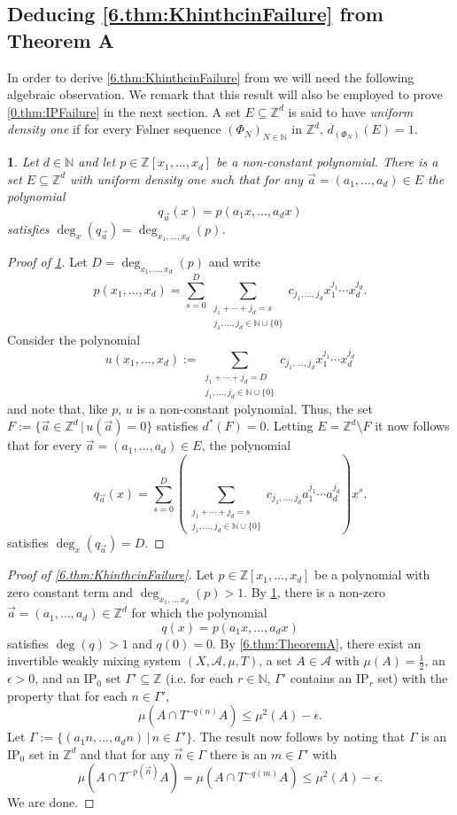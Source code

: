 \documentclass[11pt,american,preprint]{elsarticle}
\numberwithin{equation}{section}
\theoremstyle{plain}
\theoremstyle{plain*}
\theoremstyle{plain}
\newtheorem{lem}[thm]{\protect\lemmaname}
\theoremstyle{plain*}
\theoremstyle{plain}
\theoremstyle{plain*}
\theoremstyle{remark}
\theoremstyle{remark*}
\theoremstyle{remark}
\theoremstyle{remark*}
\theoremstyle{remark}
\theoremstyle{remark*}
\theoremstyle{plain}
\theoremstyle{definition}
\theoremstyle{plain}
\theoremstyle{plain} %
\providecommand{\lemmaname}{Lemma}
\newcommand{\N}{\mathbb{N}}
\newcommand{\Z}{\mathbb{Z}}
\begin{document}
\subsection{Deducing \cref{6.thm:KhinthcinFailure} from Theorem A}\label{sec:7.1}
In order to  derive \cref{6.thm:KhinthcinFailure}   from  \cite[Theorem A]{ZelIP0Khintchine2023} we will need the following algebraic observation. We remark that this result will also be employed to prove \cref{0.thm:IPFailure} in the next section. A set $E\subseteq \Z^d$ is said to have \textit{uniform density one} if  for every F{\o}lner sequence $(\Phi_N)_{N\in\N}$ in $\Z^d$, $\overline d_{(\Phi_N)}(E)=1$.  
\begin{lem}\label{6.lem:DegreeOfLinearRestriction}
    Let $d\in\N$ and let $p\in \Z[x_1,...,x_d]$ be a non-constant polynomial. There is a set $E\subseteq \Z^d$ with uniform density one such that for any $\vec a=(a_1,...,a_d)\in E$ the polynomial 
    $$q_{\vec a}(x)=p(a_1x,...,a_dx)$$
    satisfies $\deg_x(q_{\vec a})=\deg_{x_1,...,x_d}(p)$.
\end{lem}
\begin{proof}[Proof of \cref{6.lem:DegreeOfLinearRestriction}] Let $D=\deg_{x_1,...,x_d}(p)$ and   write
$$
p(x_1,...,x_d)=\sum_{s=0}^D\sum_{\substack{j_1+\cdots+j_d=s\\j_1,...,j_d\in\N\cup\{0\}}}c_{j_1,...,j_d}x_1^{j_1}\cdots x_d^{j_d}.
$$
Consider the polynomial 
$$
u(x_1,...,x_d):= \sum_{\substack{j_1+\cdots+j_d=D\\j_1,...,j_d\in\N\cup\{0\}}}c_{j_1,...,j_d}x_1^{j_1}\cdots x_d^{j_d}
$$
and note that, like $p$, $u$ is a non-constant polynomial. Thus,  the set $F:=\{\vec a\in\Z^d\,|\,u(\vec a)=0 \}$ satisfies $d^*(F)=0$. Letting $E=\Z^d\setminus F$ it now follows that for every $\vec a=(a_1,...,a_d)\in E$, the polynomial  
$$
q_{\vec a}(x)=\sum_{s=0}^D\left(\sum_{\substack{j_1+\cdots+j_d=s\\j_1,...,j_d\in\N\cup\{0\}}}c_{j_1,...,j_d}a_1^{j_1}\cdots a_d^{j_d}\right)x^s.
$$
satisfies $\deg_x(q_{\vec a})=D$.
\end{proof}
\begin{proof}[Proof of \cref{6.thm:KhinthcinFailure}]
Let $p\in \Z[x_1,...,x_d]$ be a polynomial with zero constant term and  $\deg_{x_1,..,x_d}(p)>1$. By \cref{6.lem:DegreeOfLinearRestriction}, there is a non-zero $\vec a=(a_1,...,a_d)\in \Z^d$ for which the polynomial 
$$q(x)=p(a_1x,...,a_dx)$$
satisfies $\deg(q)>1$ and $q(0)=0$. By \cref{6.thm:TheoremA}, there exist an invertible weakly mixing system $(X,\mathcal A,\mu,T)$, a set $A\in\mathcal A$ with $\mu(A)=\frac{1}{2}$, an $\epsilon>0$, and an IP$_0$ set $\Gamma'\subseteq \Z$ (i.e. for each $r\in\N$, $\Gamma'$ contains an IP$_r$ set) with the property that for each $n\in\Gamma'$, 
\begin{equation}\label{6.eq:qConsequenceOfThmA}
\mu(A\cap T^{-q(n)}A)\leq\mu^2(A)-\epsilon.
\end{equation}
Let $\Gamma:=\{(a_1n,...,a_dn)\,|\,n\in \Gamma'\}$. The result now follows by noting that $\Gamma$ is an IP$_0$ set in $\Z^d$ and that for any $\vec n\in \Gamma$ there is an $m\in\Gamma'$ with 
$$
\mu(A\cap T^{-p(\vec n)}A)=\mu(A\cap T^{-q(m)}A)\leq\mu^2(A)-\epsilon.
$$
We are done. 
\end{proof}
\end{document}
